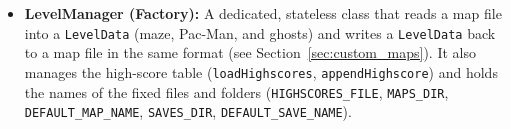 \documentclass[11pt, a4paper]{article}
\begin{document}
\begin{itemize}
\begin{itemize}
        \item \textbf{BACK} returns to the menu; if the map has unsaved changes (\texttt{unsaved}), it asks first. Like the \texttt{GamePanel}, the editor does not know the \texttt{MainFrame}: it receives ``go back to the menu'' as a \texttt{Runnable} (\texttt{onBack}).
    \end{itemize}
    \item \textbf{LevelManager (Factory):} A dedicated, stateless class that reads a map file into a \texttt{LevelData} (maze, Pac-Man, and ghosts) and writes a \texttt{LevelData} back to a map file in the same format (see Section~\ref{sec:custom_maps}). It also manages the high-score table (\texttt{loadHighscores}, \texttt{appendHighscore}) and holds the names of the fixed files and folders (\texttt{HIGHSCORES\_FILE}, \texttt{MAPS\_DIR}, \texttt{DEFAULT\_MAP\_NAME}, \texttt{SAVES\_DIR}, \texttt{DEFAULT\_SAVE\_NAME}).
\end{itemize}
\end{document}
